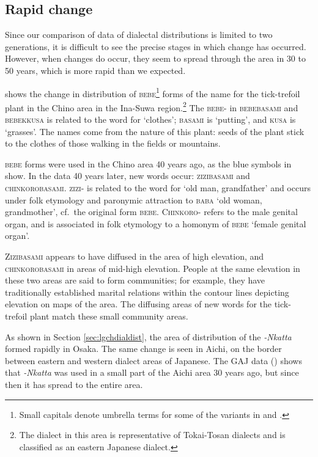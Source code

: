 \documentclass[output=paper]{LSP/langsci}
\begin{document}
\subsection{Rapid change}
Since our comparison of  data of dialectal distributions is limited to two generations, it is difficult to see the precise stages in which change has occurred. However, when changes do occur, they seem to spread through the area in 30 to 50 years, which is more rapid than we expected.

 shows the change in distribution of \textsc{bebe}\footnote{ Small capitals denote umbrella terms for some of the variants in  and .} forms of the name for the tick-trefoil plant in the Chino area in the Ina-Suwa region.\footnote{ The dialect in this area is representative of Tokai-Tosan dialects and is classified as an eastern Japanese dialect.} The \textsc{bebe-} in \textsc{bebebasami} and \textsc{bebekkusa} is related to the word for `clothes'; \textsc{basami} is `putting', and \textsc{kusa} is `grasses'. The names come from the nature of this plant: seeds of the plant stick to the clothes of those walking in the fields or mountains.

\textsc{bebe} forms were used in the Chino area 40 years ago, as the blue symbols in  show. In the data 40 years later, new words occur: \textsc{zizibasami} and \textsc{chinkorobasami}.  \textsc{zizi-} is related to the word for `old man, grandfather' and occurs under folk etymology and paronymic attraction to \textsc{baba} `old woman, grandmother', cf.\ the original form \textsc{bebe}. \textsc{Chinkoro-} refers to the male genital organ, and is associated in folk etymology to a homonym of \textsc{bebe} `female genital organ'.

\textsc{Zizibasami} appears to have diffused in the area of high elevation, and \textsc{chinkorobasami} in areas of mid-high elevation. People at the same elevation in these two areas are said to form communities; for example, they have traditionally established marital relations within the contour lines depicting elevation on maps of the area. The diffusing areas of new words for the tick-trefoil plant match these small community areas.

As shown in Section \ref{sec:lgchdialdist}, the area of distribution of the  \textit{-Nkatta} formed rapidly in Osaka. The same change is seen in Aichi, on the border between eastern and western dialect areas of Japanese. The GAJ data () shows that \textit{-Nkatta} was used in a small part of the Aichi area 30 years ago, but since then it has spread to the entire area.
\end{document}
